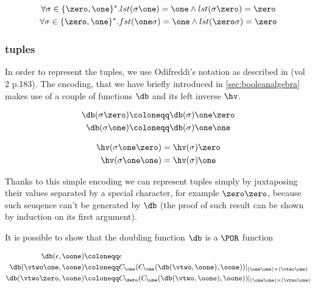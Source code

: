 \begin{remark}
\[
\begin{gathered}
\forall \sigma \in \{\zero, \one\}^*. lst(\sigma \one)=\one \land lst(\sigma \zero)=\zero\\
\forall \sigma \in \{\zero, \one\}^*. fst(\one\sigma)=\one \land lst(\zero\sigma)=\zero\\
\end{gathered}
\]
\end{remark}

\subsubsection{tuples}

In order to represent the tuples, we use Odifreddi's notation as described in (vol 2 p.183). The encoding, that we have briefly introduced in \ref{sec:booleanalgebra} makes use of a couple of functions $\db$ and its left inverse $\hv$.

\begin{defn}

\begin{align*}
\db(\sigma\zero) &\coloneqq \db(\sigma)\one\zero\\
\db(\sigma\one) &\coloneqq  \db(\sigma)\one\one
\end{align*}


\begin{align*}
\hv (\sigma \one\zero)&=\hv(\sigma)\zero\\
\hv (\sigma \one\one)&=\hv(\sigma)\one\\
\end{align*}
\end{defn}

Thanks to this simple encoding we can represent tuples simply by juxtaposing their values separated by a special character, for example $\zero\zero$, because such seuqence can't be generated by $\db$ (the proof of such result can be shown by induction on its first argument).

It is possible to show that the doubling function $\db$ is a $\POR$ function

\begin{align*}
\db(\epsilon, \oone)&\coloneqq \epsilon\\
\db(\vtwo\one, \oone)&\coloneqq C_\one(C_\one(\db(\vtwo, \oone), \oone))|_{(\one\one)\times(\vtwo \one)}\\
\db(\vtwo\zero, \oone)&\coloneqq C_\zero(C_\one(\db(\vtwo, \oone), \oone))|_{(\one\one)\times(\vtwo \one)}\\
\end{align*}

